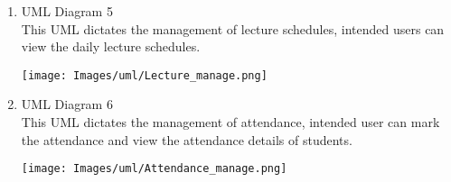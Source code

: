 \begin{enumerate}
    \newpage
    \item UML Diagram 5 \\
    \hspace{1cm} This UML dictates the management of lecture schedules, intended users can view the daily lecture schedules.
    \vspace{1cm}
    \begin{center}
        \texttt{[image: Images/uml/Lecture\_manage.png]}
    \end{center}
    
    \newpage
    \item UML Diagram 6 \\
    \hspace{1cm} This UML dictates the management of attendance, intended user can mark the attendance and view the attendance details of students.
    \vspace{1cm}
    \vspace{1cm}
    \begin{center}
        \texttt{[image: Images/uml/Attendance\_manage.png]}
    \end{center}

\end{enumerate}